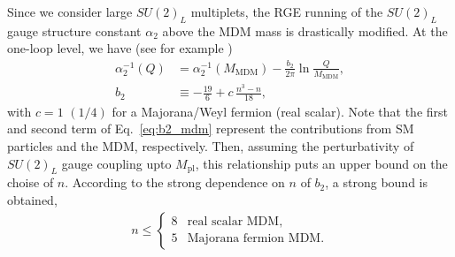 \documentclass[12pt,twoside,book]{article}
\begin{document}
Since we consider large $SU(2)_L$ multiplets, the RGE running of the $SU(2)_L$ gauge structure constant $\alpha_2$ above the MDM mass is drastically modified.
At the one-loop level, we have (see for example \cite{Machacek:1983tz})
\begin{align}
  \alpha_2^{-1} (Q) &= \alpha_2^{-1} (M_{\mathrm{MDM}}) - \frac{b_2}{2\pi} \ln \frac{Q}{M_{\mathrm{MDM}}},\\
  b_2 &\equiv -\frac{19}{6} + c\, \frac{n^3 - n}{18},
  \label{eq:b2_mdm}
\end{align}
with $c = 1$ $(1/4)$ for a Majorana/Weyl fermion (real scalar).
Note that the first and second term of Eq.~\eqref{eq:b2_mdm} represent the contributions from SM particles and the MDM, respectively.
Then, assuming the perturbativity of $SU(2)_L$ gauge coupling upto $M_{\mathrm{pl}}$, this relationship puts an upper bound on the choise of $n$.
According to the strong dependence on $n$ of $b_2$, a strong bound is obtained,
\begin{align}
  n \leq
  \begin{cases}
    8 & \text{real scalar MDM},\\
    5 & \text{Majorana fermion MDM}.
  \end{cases}
\end{align}
\end{document}
